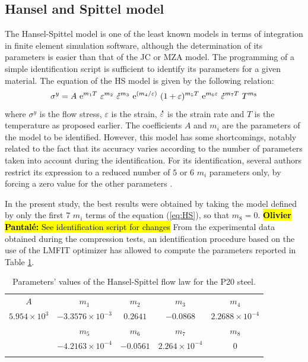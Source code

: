 \documentclass[twoside,english,1p,final,sort&compress]{elsarticle}
\theoremstyle{plain}
\newcommand{\e}[1]{{\rm e}^{#1}}
\newcommand{\mdot}[1]{\accentset{\mbox{\bfseries .}}{#1}}
\DeclareRobustCommand{\OP}[1]{ {\begingroup\sethlcolor{VWyellow}\textcolor{red}{\hl{\textbf{Olivier Pantal\'e:} #1}}\endgroup} }
\begin{document}
\subsection{Hansel and Spittel model\label{sec:HSmodel}}

The Hansel-Spittel model \cite{Hensel-1978} is one of the least known models in terms of integration in finite element simulation software, although the determination of its parameters is easier than that of the JC or MZA model.
The programming of a simple identification script is sufficient to identify its parameters for a given material.
The equation of the HS model is given by the following relation:
\begin{equation}
\sigma^y = A~\e{m_1T}~\varepsilon^{m_2}~\mdot\varepsilon^{m_3}~\e{({m_4}/{\varepsilon})}~(1+\varepsilon)^{m_5T}~\e{m_6\varepsilon}~\mdot\varepsilon^{m_7T}~T^{m_8} \label{eq:HS}
\end{equation}
where $\sigma^y$ is the flow stress, $\varepsilon$ is the strain, $\mdot\varepsilon$ is the strain rate and $T$ is the temperature as proposed earlier.
The coefficients $A$ and $m_i$ are the parameters of the model to be identified.
However, this model has some shortcomings, notably related to the fact that its accuracy varies according to the number of parameters taken into account during the identification.
For its identification, several authors restrict its expression to a reduced number of $5$ or $6$ $m_i$ parameters only, by forcing a zero value for the other parameters \cite{Chadha-2018, Rudnytskyj-2020, Mehtedi-2015}.

In the present study, the best results were obtained by taking the model defined by only the first $7$ $m_i$ terms of the equation (\ref{eq:HS}), so that $m_8=0$.\OP{See identification script for changes}
From the experimental data obtained during the compression tests, an identification procedure based on the use of the LMFIT optimizer \cite{Newville-2016} has allowed to compute the parameters reported in Table \ref{tab:HS}.

\begin{table}[h!]
\centering
\caption{Parameters' values of the Hansel-Spittel flow law for the P20 steel.}
\begin{tabular}{ccccc}
\hline
$A$ & $m_1$ & $m_2$ & $m_3$ & $m_4$\\
$5.954\times 10^{3}$ & $-3.3576\times10^{-3}$ & $0.2641$ & $-0.0868$ & $2.2688\times10^{-4}$\\\hline
& $m_5$ & $m_6$ & $m_7$ & $m_8$\\
& $-4.2163\times10^{-4}$ & $-0.0561$ & $2.264\times10^{-4}$ & $0$\\\hline
\label{tab:HS}
\end{tabular}
\end{table}
\end{document}
